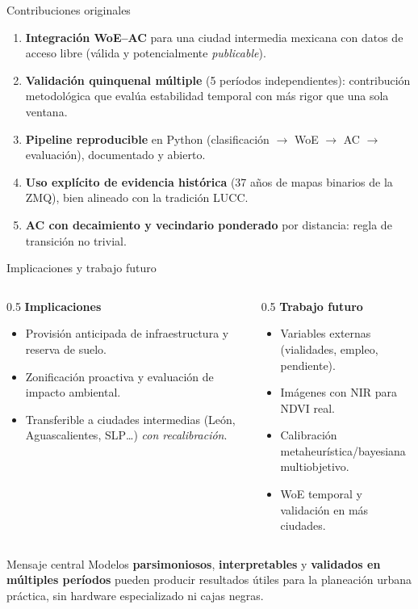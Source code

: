 \documentclass[aspectratio=169,11pt]{beamer}
\newcommand{\highlight}[1]{\textcolor{UNAMBlue}{\textbf{#1}}}
\begin{document}
\begin{frame}{Contribuciones originales}
  \footnotesize
  \begin{enumerate}
    \item \highlight{Integración WoE--AC} para una ciudad intermedia mexicana con datos de acceso libre (válida y potencialmente \emph{publicable}).
    \item \highlight{Validación quinquenal múltiple} (5 períodos independientes): contribución metodológica que evalúa estabilidad temporal con más rigor que una sola ventana.
    \item \highlight{Pipeline reproducible} en Python (clasificación $\rightarrow$ WoE $\rightarrow$ AC $\rightarrow$ evaluación), documentado y abierto.
    \item \highlight{Uso explícito de evidencia histórica} (37 años de mapas binarios de la ZMQ), bien alineado con la tradición LUCC.
    \item \highlight{AC con decaimiento y vecindario ponderado} por distancia: regla de transición no trivial.
  \end{enumerate}
\end{frame}

\begin{frame}{Implicaciones y trabajo futuro}
  \begin{columns}[T]
    \begin{column}{0.5\textwidth}
      \textbf{\textcolor{UNAMBlue}{Implicaciones}}
      \small
      \begin{itemize}
        \item Provisión anticipada de infraestructura y reserva de suelo.
        \item Zonificación proactiva y evaluación de impacto ambiental.
        \item Transferible a ciudades intermedias (León, Aguascalientes, SLP\ldots) \emph{con recalibración}.
      \end{itemize}
    \end{column}
    \begin{column}{0.5\textwidth}
      \textbf{\textcolor{UNAMBlue}{Trabajo futuro}}
      \small
      \begin{itemize}
        \item Variables externas (vialidades, empleo, pendiente).
        \item Imágenes con NIR para NDVI real.
        \item Calibración metaheurística/bayesiana multiobjetivo.
        \item WoE temporal y validación en más ciudades.
      \end{itemize}
    \end{column}
  \end{columns}
  \vspace{0.2cm}
  \begin{alertblock}{Mensaje central}
    \footnotesize Modelos \highlight{parsimoniosos}, \highlight{interpretables} y \highlight{validados en múltiples períodos} pueden producir resultados útiles para la planeación urbana práctica, sin hardware especializado ni cajas negras.
  \end{alertblock}
\end{frame}
\end{document}
